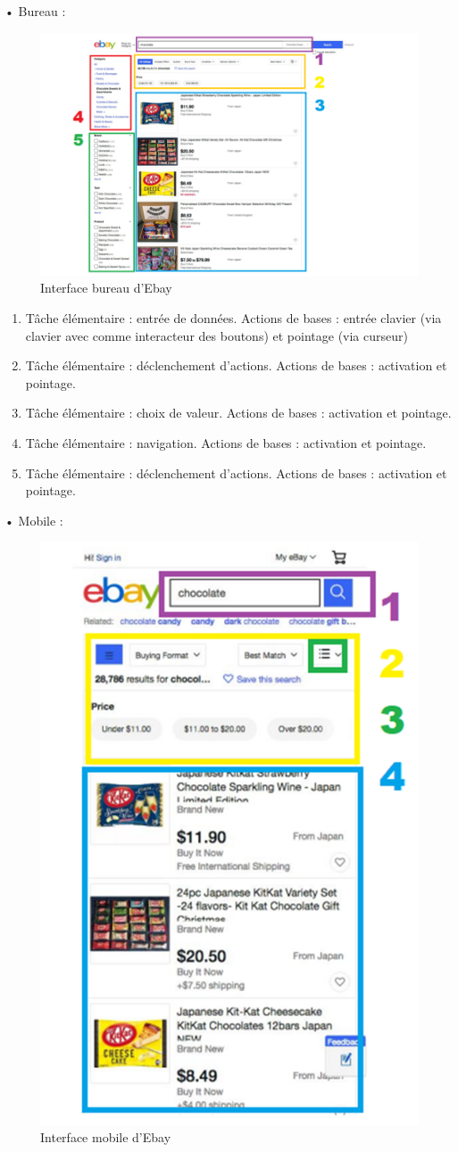 \documentclass{article}
\begin{document}
• Bureau :
\begin{figure}[H]
    \centering
    \includegraphics[trim=0cm 0cm 3cm 0cm,width=0.8\linewidth]{ebay_desktop.png}
    \caption{Interface bureau d'Ebay}
\end{figure}

\vspace{1cm}
\begin{enumerate}[label=\arabic*)]
    \item Tâche élémentaire : entrée de données. Actions de bases : entrée clavier (via clavier avec comme interacteur des boutons) et pointage (via curseur)
    \item Tâche élémentaire : déclenchement d'actions. Actions de bases : activation et pointage.
    \item Tâche élémentaire : choix de valeur. Actions de bases : activation et pointage.
    \item Tâche élémentaire : navigation. Actions de bases : activation et pointage.
    \item Tâche élémentaire : déclenchement d'actions. Actions de bases : activation et pointage.
\end{enumerate}
\clearpage


• Mobile :
\begin{figure}[H]
    \centering
    \includegraphics[width=0.4\linewidth]{ebay_mobile.png}
    \caption{Interface mobile d'Ebay}
\end{figure}
\end{document}
